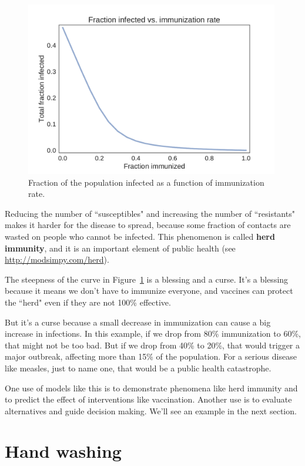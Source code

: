 \documentclass[12pt]{book}
\theoremstyle{exercise}
\begin{document}
\begin{figure}
\centerline{\includegraphics[height=3in]{figs/chap05-fig03.pdf}}
\caption{Fraction of the population infected as a function of immunization rate.}
\label{chap05-fig03}
\end{figure} 

Reducing the number of ``susceptibles" and increasing the number of ``resistants" makes it harder for the disease to spread, because some fraction of contacts are wasted on people who cannot be infected.  This phenomenon is called {\bf herd immunity}, and it is an important element of public health (see \url{http://modsimpy.com/herd}).

The steepness of the curve in Figure~\ref{chap05-fig03} is a blessing and a curse.  It's a blessing because it means we don't have to immunize everyone, and vaccines can protect the ``herd" even if they are not 100\% effective.

But it's a curse because a small decrease in immunization can cause a big increase in infections.  In this example, if we drop from 80\% immunization to 60\%, that might not be too bad.  But if we drop from 40\% to 20\%, that would trigger a major outbreak, affecting more than 15\% of the population.  For a serious disease like measles, just to name one, that would be a public health catastrophe.

One use of models like this is to demonstrate phenomena like herd immunity and to predict the effect of interventions like vaccination.  Another use is to evaluate alternatives and guide decision making.  We'll see an example in the next section.


\section{Hand washing}
\end{document}

